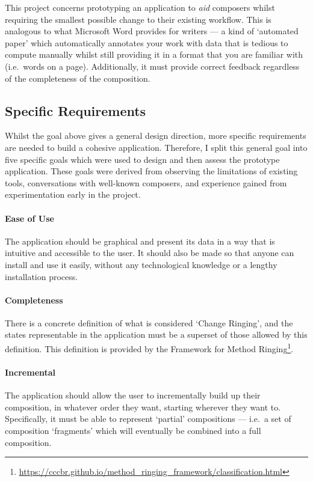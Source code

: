 \documentclass[12pt]{article}
\newcommand{\footurl}[1]{\footnote{\url{#1}}}
\begin{document}
This project concerns prototyping an application to \emph{aid} composers whilst requiring the
smallest possible change to their existing workflow.  This is analogous to what Microsoft Word
provides for writers --- a kind of `automated paper' which automatically annotates your work with
data that is tedious to compute manually whilst still providing it in a format that you are familiar
with (i.e.\ words on a page).  Additionally, it must provide correct feedback regardless of the
completeness of the composition.

\subsection{Specific Requirements}\label{sec:requirements}

Whilst the goal above gives a general design direction, more specific requirements are needed to
build a cohesive application.  Therefore, I split this general goal into five specific goals which
were used to design and then assess the prototype application.  These goals were derived from
observing the limitations of existing tools, conversations with well-known composers, and experience
gained from experimentation early in the project.  

\paragraph{Ease of Use} The application should be graphical and present its data in a way that is
intuitive and accessible to the user.  It should also be made so that anyone can install and use it
easily, without any technological knowledge or a lengthy installation process.

\paragraph{Completeness} There is a concrete definition of what is considered `Change
Ringing', and the states representable in the application must be a superset of those allowed by
this definition.  This definition is provided by the Framework for Method
Ringing\footurl{https://cccbr.github.io/method_ringing_framework/classification.html}.
\paragraph{Incremental} The application should allow the user to incrementally build up their
composition, in whatever order they want, starting wherever they want to.  Specifically, it must
be able to represent `partial' compositions --- i.e.\ a set of composition `fragments' which will
eventually be combined into a full composition.
\end{document}
